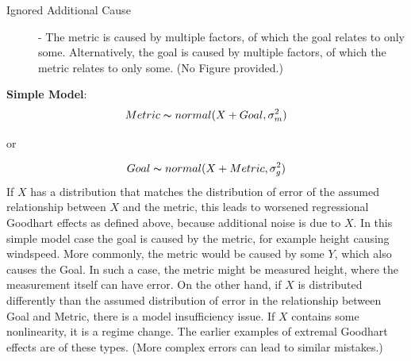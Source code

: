 \documentclass[10pt]{article}
\begin{document}
\begin{figure}[htb]
\centering
{}%
\hspace{0.25cm}
%
\end{figure}

\begin{description}
\item[Ignored Additional Cause] - The metric is caused by multiple factors, of which the goal relates to only some. Alternatively, the goal is caused by multiple factors, of which the metric relates to only some. (No Figure provided.)
\end{description}
\textbf{Simple Model}:  \begin{equation} Metric \thicksim normal(X + Goal, \sigma_{m}^2)\end{equation} \begin{center}or\end{center}  \begin{equation} Goal \thicksim normal(X + Metric, \sigma_{g}^2) \end{equation}
If $X$ has a distribution that matches the distribution of error of the assumed relationship between $X$ and the metric, this leads to worsened regressional Goodhart effects as defined above, because additional noise is due to $X$. In this simple model case the goal is caused by the metric, for example height causing windspeed. More commonly, the metric would be caused by some $Y$, which also causes the Goal. In such a case, the metric might be measured height, where the measurement itself can have error. On the other hand, if $X$ is distributed differently than the assumed distribution of error in the relationship between Goal and Metric, there is a model insufficiency issue. If $X$ contains some nonlinearity, it is a regime change. The earlier examples of extremal Goodhart effects are of these types. (More complex errors can lead to similar mistakes.)
\end{document}
